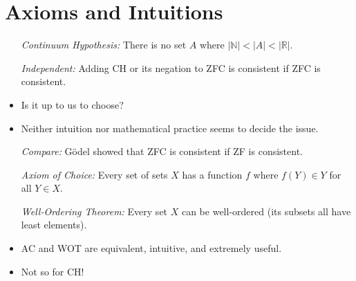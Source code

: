 \documentclass[a4paper, 11pt]{article} %
\newcommand{\abs}[1]{|#1|} %
\newcommand{\N}{\mathbb{N}}
\newcommand{\R}{\mathbb{R}}
\begin{document}
\begin{enumerate}
\begin{enumerate}
\end{enumerate}



\section*{Axioms and Intuitions}

\begin{itemize}
  \item[\it Continuum Hypothesis:] There is no set $A$ where $\abs{\N} < \abs{A} < \abs{\R}$.
  \item[\it Independent:] Adding CH or its negation to ZFC is consistent if ZFC is consistent.
  \item Is it up to us to choose?
  \item Neither intuition nor mathematical practice seems to decide the issue.
  \item[\it Compare:] G\"{o}del showed that ZFC is consistent if ZF is consistent.
  \item[\it Axiom of Choice:] Every set of sets $X$ has a function $f$ where $f(Y)\in Y$ for all $Y\in X$. 
  \item[\it Well-Ordering Theorem:] Every set $X$ can be well-ordered (its subsets all have least elements). 
  \item AC and WOT are equivalent, intuitive, and extremely useful.
  \item Not so for CH!
\end{itemize}
\end{document}
